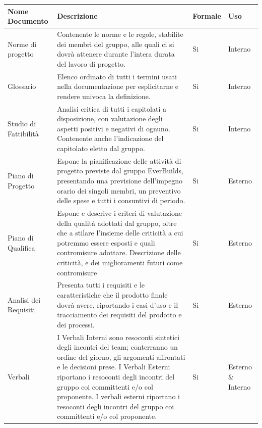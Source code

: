 			\begin{center}
				\begin{longtable}{|p{3.5cm}|p{5cm}|p{2cm}|p{3cm}|}
					\hline
					\rowcolor{lighter-grayer}
					\textbf{Nome Documento} & \textbf{Descrizione} & \textbf{Formale} & \textbf{Uso}\\
					\hline
					\endfirsthead
					Norme di progetto & Contenente le norme e le regole, stabilite dei membri del gruppo, alle quali ci si dovrà attenere durante l’intera durata del lavoro di progetto. & Si & Interno \\
					\hline
					Glossario & Elenco ordinato di tutti i termini usati nella documentazione per esplicitarne e rendere univoca la definizione. & Si & Interno \\
					\hline
					Studio di Fattibilità & Analisi critica di tutti i capitolati a disposizione, con valutazione degli aspetti positivi e negativi di ognuno. Contenente anche l’indicazione del capitolato eletto dal gruppo. & Si & Interno \\
					\hline
					Piano di Progetto & Espone la pianificazione delle attività di progetto previste dal gruppo EverBuilds, presentando una previsione dell’impegno orario dei singoli membri, un preventivo delle spese e tutti i consuntivi di periodo. & Si & Esterno \\
					\hline
					Piano di Qualifica & Espone e descrive i criteri di valutazione della qualità adottati dal gruppo, oltre che a stilare l’insieme delle criticità a cui potremmo essere esposti e quali contromisure adottare. \newline Descrizione delle criticità, e dei miglioramenti futuri come contromisure & Si & Esterno \\
					\hline
					Analisi dei Requisiti & Presenta tutti i requisiti e le caratteristiche che il prodotto finale dovrà avere, riportando i casi d’uso e il tracciamento dei requisiti del prodotto e dei processi. & Si & Esterno \\
					\hline
					Verbali & I Verbali Interni sono resoconti sintetici degli incontri del team; conterranno un ordine del giorno, gli argomenti affrontati e le decisioni prese. I Verbali Esterni riportano i resoconti degli incontri del gruppo coi committenti e/o col proponente. \newline I verbali esterni riportano i resoconti degli incontri del gruppo coi committenti e/o col proponente. & Si & Esterno \& Interno  \\
					\hline
				\end{longtable}
			\end{center}
